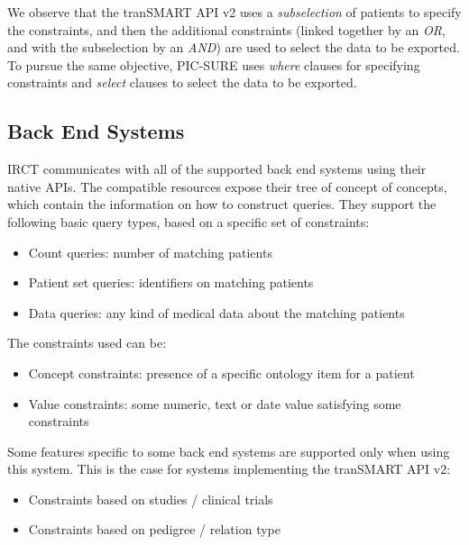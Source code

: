 We observe that the tranSMART API v2 uses a \emph{subselection} of patients to specify the constraints, and then the additional constraints (linked together by an \emph{OR}, and with the subselection by an \emph{AND}) are used to select the data to be exported.
To pursue the same objective, PIC-SURE uses \emph{where} clauses for specifying constraints and \emph{select} clauses to select the data to be exported.


\subsection{Back End Systems}

IRCT communicates with all of the supported back end systems using their native APIs.
The compatible resources expose their tree of concept of concepts, which contain the information on how to construct queries.
They support the following basic query types, based on a specific set of constraints:
\begin{itemize}
    \item Count queries: number of matching patients
    \item Patient set queries: identifiers on matching patients
    \item Data queries: any kind of medical data about the matching patients
\end{itemize}

The constraints used can be:
\begin{itemize}
    \item Concept constraints: presence of a specific ontology item for a patient
    \item Value constraints: some numeric, text or date value satisfying some constraints
\end{itemize}

Some features specific to some back end systems are supported only when using this system.
This is the case for systems implementing the tranSMART API v2:
\begin{itemize}
    \item Constraints based on studies / clinical trials
    \item Constraints based on pedigree / relation type
\end{itemize}
